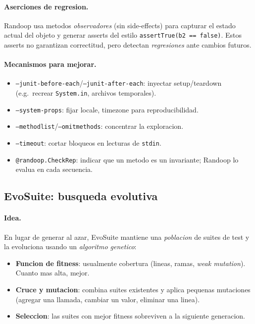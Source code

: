 \documentclass[12pt,a4paper]{article}
\begin{document}
\paragraph{Aserciones de regresion.} Randoop usa metodos \emph{observadores} (sin
side-effects) para capturar el estado actual del objeto y generar asserts del estilo
\texttt{assertTrue(b2 == false)}. Estos asserts no garantizan correctitud, pero detectan
\emph{regresiones} ante cambios futuros.

\paragraph{Mecanismos para mejorar.}

\begin{itemize}
  \item \texttt{--junit-before-each}/\texttt{--junit-after-each}: inyectar setup/teardown
  (e.g.\ recrear \texttt{System.in}, archivos temporales).
  \item \texttt{--system-props}: fijar locale, timezone para reproducibilidad.
  \item \texttt{--methodlist}/\texttt{--omitmethods}: concentrar la exploracion.
  \item \texttt{--timeout}: cortar bloqueos en lecturas de \texttt{stdin}.
  \item \texttt{@randoop.CheckRep}: indicar que un metodo es un invariante;
  Randoop lo evalua en cada secuencia.
\end{itemize}

\subsection{EvoSuite: busqueda evolutiva}

\paragraph{Idea.} En lugar de generar al azar, EvoSuite mantiene una \emph{poblacion} de
suites de test y la evoluciona usando un \emph{algoritmo genetico}:

\begin{itemize}
  \item \textbf{Funcion de fitness}: usualmente cobertura (lineas, ramas, \emph{weak
  mutation}). Cuanto mas alta, mejor.
  \item \textbf{Cruce y mutacion}: combina suites existentes y aplica pequenas mutaciones
  (agregar una llamada, cambiar un valor, eliminar una linea).
  \item \textbf{Seleccion}: las suites con mejor fitness sobreviven a la siguiente
  generacion.
\end{itemize}
\end{document}
